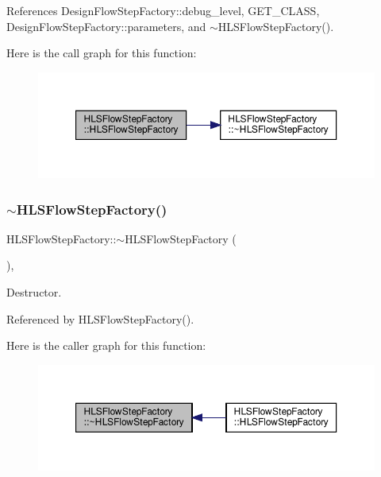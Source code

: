 References Design\+Flow\+Step\+Factory\+::debug\+\_\+level, G\+E\+T\+\_\+\+C\+L\+A\+SS, Design\+Flow\+Step\+Factory\+::parameters, and $\sim$\+H\+L\+S\+Flow\+Step\+Factory().

Here is the call graph for this function\+:
\nopagebreak
\begin{figure}[H]
\begin{center}
\leavevmode
\includegraphics[width=350pt]{dd/d39/classHLSFlowStepFactory_a8af54ca36375ae5819956b489f0fa72b_cgraph}
\end{center}
\end{figure}
\mbox{\label{classHLSFlowStepFactory_aca3fa064be068b4e32b4e5262e6436f5}} 
\subsubsection{\texorpdfstring{$\sim$\+H\+L\+S\+Flow\+Step\+Factory()}{~HLSFlowStepFactory()}}
{\footnotesize\ttfamily H\+L\+S\+Flow\+Step\+Factory\+::$\sim$\+H\+L\+S\+Flow\+Step\+Factory (\begin{DoxyParamCaption}{ }\end{DoxyParamCaption})\hspace{0.3cm}{\ttfamily [override]}, {\ttfamily [default]}}



Destructor. 



Referenced by H\+L\+S\+Flow\+Step\+Factory().

Here is the caller graph for this function\+:
\nopagebreak
\begin{figure}[H]
\begin{center}
\leavevmode
\includegraphics[width=350pt]{dd/d39/classHLSFlowStepFactory_aca3fa064be068b4e32b4e5262e6436f5_icgraph}
\end{center}
\end{figure}


